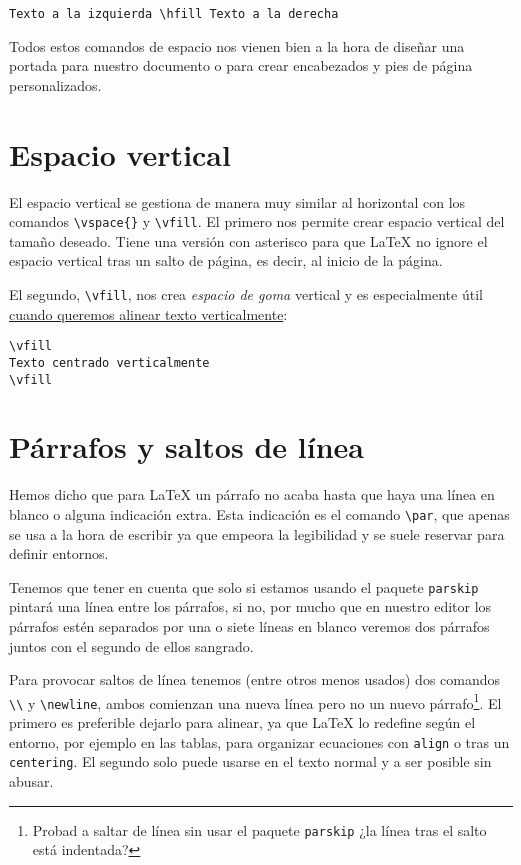 \begin{lstlisting}[language={[latex]tex}]
Texto a la izquierda \hfill Texto a la derecha
\end{lstlisting}

Todos estos comandos de espacio nos vienen bien a la hora de diseñar una
portada para nuestro documento o para crear encabezados y pies de página
personalizados.

\section{Espacio vertical}

El espacio vertical se gestiona de manera muy similar al horizontal con
los comandos \lstinline!\vspace{}! y \lstinline!\vfill!. El primero nos
permite crear espacio vertical del tamaño deseado. Tiene una versión con
asterisco para que LaTeX no ignore el espacio vertical tras un salto de
página, es decir, al inicio de la página.

El segundo, \lstinline!\vfill!, nos crea \emph{espacio de goma} vertical
y es especialmente útil
\href{http://tex.stackexchange.com/questions/2326/vertically-center-text-on-a-page}{cuando
queremos alinear texto verticalmente}:

\begin{lstlisting}[language={[latex]tex}]
\vfill
Texto centrado verticalmente
\vfill
\end{lstlisting}

\section{Párrafos y saltos de línea}

Hemos dicho que para LaTeX un párrafo no acaba hasta que haya una línea
en blanco o alguna indicación extra. Esta indicación es el comando
\lstinline!\par!, que apenas se usa a la hora de escribir ya que empeora
la legibilidad y se suele reservar para definir entornos.

Tenemos que tener en cuenta que solo si estamos usando el paquete
\lstinline!parskip! pintará una línea entre los párrafos, si no, por
mucho que en nuestro editor los párrafos estén separados por una o siete
líneas en blanco veremos dos párrafos juntos con el segundo de ellos
sangrado.

Para provocar saltos de línea tenemos (entre otros menos usados) dos
comandos \lstinline!\\! y \lstinline!\newline!, ambos comienzan una
nueva línea pero no un nuevo párrafo\footnote{Probad a saltar de línea
  sin usar el paquete \lstinline!parskip! ¿la línea tras el salto está
  indentada?}. El primero es preferible dejarlo para alinear, ya que
LaTeX lo redefine según el entorno, por ejemplo en las tablas, para
organizar ecuaciones con \lstinline!align! o tras un
\lstinline!centering!. El segundo solo puede usarse en el texto normal y
a ser posible sin abusar.

